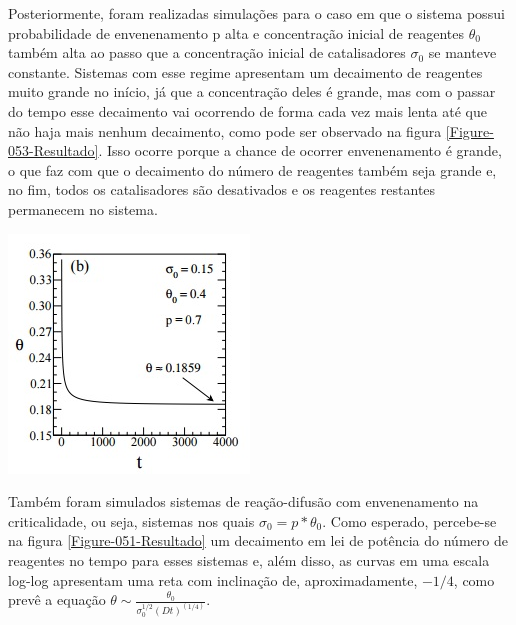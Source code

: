 Posteriormente, foram realizadas simulações para o caso em que o sistema possui
probabilidade de envenenamento p alta e concentração inicial de reagentes
$\theta_0$ também alta ao passo que a concentração inicial de catalisadores
$\sigma_0$ se manteve constante. Sistemas com esse regime apresentam um
decaimento de reagentes muito grande no início, já que a concentração deles
é grande, mas com o passar do tempo esse decaimento vai ocorrendo de forma
cada vez mais lenta até que não haja mais nenhum decaimento, como pode ser
observado na figura \ref{Figure-053-Resultado}. Isso ocorre porque a chance de
ocorrer envenenamento é grande, o que faz com que o decaimento do número de
reagentes também seja grande e, no fim, todos os catalisadores são desativados e
os reagentes restantes permanecem no sistema.

{ \centering
	\captionsetup{type=figure}
	\hfill \break
	\includegraphics[width=\columnwidth]{./figures/053-Resultado.jpg}
	\label{Figure-053-Resultado}
}

Também foram simulados sistemas de reação-difusão com envenenamento na
criticalidade, ou seja, sistemas nos quais $\sigma_0 = p*\theta_0$. Como
esperado, percebe-se na figura \ref{Figure-051-Resultado} um decaimento em lei
de potência do número de reagentes no tempo para esses sistemas e, além disso,
as curvas em uma escala log-log apresentam uma reta com inclinação de,
aproximadamente, $-1/4$, como prevê a equação
$\theta \sim \frac{\theta_0}{\sigma_0^{1/2}(Dt)^(1/4)}$\cite{3}.

